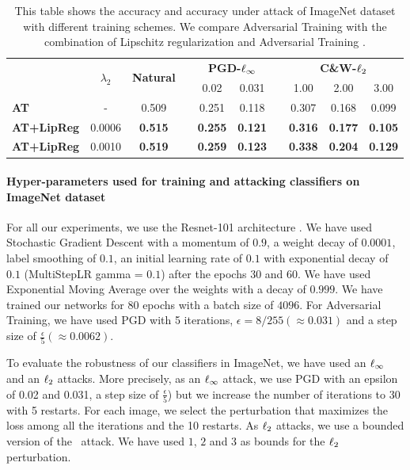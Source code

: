 \begin{table}[htb]
  \centering
  \caption{This table shows the accuracy and accuracy under attack of ImageNet dataset with different training schemes. We compare Adversarial Training with the combination of Lipschitz regularization and Adversarial Training \cite{madry2018towards}. }
    {\footnotesize
    \begin{tabular}{lccccccccc}
    \toprule
      & \multicolumn{1}{c}{\multirow{2}[4]{*}{$\lambda_2$}} & \multicolumn{1}{c}{\multirow{2}[4]{*}{\textbf{Natural}}} &   & \multicolumn{2}{c}{\textbf{PGD-}$\ell_\infty$} &   & \multicolumn{3}{c}{\textbf{C\&W-}$\ell_2$} \\
\cmidrule{5-6}\cmidrule{8-10}      &   &   &   & \multicolumn{1}{c}{0.02} & \multicolumn{1}{c}{0.031} &   & \multicolumn{1}{c}{1.00} & \multicolumn{1}{c}{2.00} & \multicolumn{1}{c}{3.00} \\
    \midrule
    \textbf{AT} & \multicolumn{1}{c}{-} & 0.509 &   & 0.251 & 0.118 &   & 0.307 & 0.168 & 0.099 \\
    \textbf{AT+LipReg} & 0.0006 & \textbf{0.515} &   & \textbf{0.255} & \textbf{0.121} &   & \textbf{0.316} & \textbf{0.177} & \textbf{0.105} \\
    \textbf{AT+LipReg} & 0.0010 & \textbf{0.519} &   & \textbf{0.259} & \textbf{0.123} &   & \textbf{0.338} & \textbf{0.204} & \textbf{0.129} \\
    \bottomrule
    \end{tabular}%
    }
\end{table}%


\paragraph{Hyper-parameters used for training and attacking classifiers on ImageNet dataset}

For all our experiments, we use the Resnet-101 architecture \cite{he2016deep}. We have used Stochastic Gradient Descent with a momentum of $0.9$, a weight decay of $0.0001$, label smoothing of $0.1$, an initial learning rate of $0.1$ with exponential decay of $0.1$ (MultiStepLR gamma = $0.1$) after the epochs $30$ and $60$. We have used Exponential Moving Average over the weights with a decay of $0.999$. We have trained our networks for 80 epochs with a batch size of $4096$. For Adversarial Training, we have used PGD with 5 iterations, $\epsilon = 8/255 (\approx 0.031)$ and a step size of $\frac{\epsilon}{5} (\approx 0.0062)$. 

To evaluate the robustness of our classifiers in ImageNet, we have used an $\ell_\infty$ and an $\ell_2$ attacks. More precisely, as an $\ell_\infty$ attack, we use PGD with an epsilon of 0.02 and 0.031, a step size of $\textstyle \frac{\epsilon}{5}$) but we increase the number of iterations to 30 with 5 restarts. For each image, we select the perturbation that maximizes the loss among all the iterations and the 10 restarts. As $\ell_2$ attacks, we use a bounded version of the~\cite{carlini2017towards} attack. We have used $1$, $2$ and $3$ as bounds for the $\ell_2$ perturbation. 


